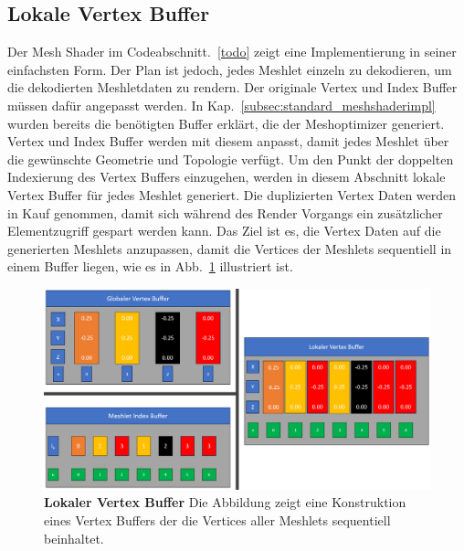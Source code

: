 \subsection{Lokale Vertex Buffer}
\label{subsec:local_vertex_buffers}
Der Mesh Shader im Codeabschnitt.~\ref{todo} zeigt eine Implementierung in seiner einfachsten Form.
Der Plan ist jedoch, jedes Meshlet einzeln zu dekodieren, um die dekodierten Meshletdaten zu rendern.
Der originale Vertex und Index Buffer müssen dafür angepasst werden.
In Kap.~\ref{subsec:standard_meshshaderimpl} wurden bereits die benötigten Buffer erklärt, die der Meshoptimizer generiert.
Vertex und Index Buffer werden mit diesem anpasst, damit jedes Meshlet über die gewünschte Geometrie und Topologie verfügt. \newline
Um den Punkt der doppelten Indexierung des Vertex Buffers einzugehen, werden in diesem Abschnitt lokale Vertex Buffer für jedes Meshlet generiert.
Die duplizierten Vertex Daten werden in Kauf genommen, damit sich während des Render Vorgangs ein zusätzlicher Elementzugriff gespart werden kann.
\newline
Das Ziel ist es, die Vertex Daten auf die generierten Meshlets anzupassen, damit die Vertices der Meshlets sequentiell in einem Buffer liegen, wie es in Abb.~\ref{fig:local_vertex_buffer} illustriert ist.
\begin{figure}[htb]
  \centering  
  \includegraphics[scale=0.375]{Bilder/local_vertex_buffer.png}
  \caption[Lokaler Vertex Buffer]{\textbf{Lokaler Vertex Buffer} Die Abbildung zeigt eine Konstruktion eines Vertex Buffers der die Vertices aller Meshlets sequentiell beinhaltet.}
  \label{fig:local_vertex_buffer}
\end{figure}

